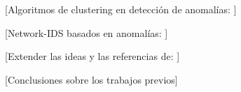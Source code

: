 [Algoritmos de clustering en detección de anomalías:
\cite{SPW12} %
\cite{Leung_2005} %
\cite{Kim_2018} %
]

[Network-IDS basados en anomalías:
\cite{Bhuyan_2014} %
]

[Extender las ideas y las referencias de:
\cite{Bohara_2016} %
]

[Conclusiones sobre los trabajos previos]
